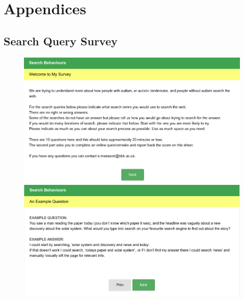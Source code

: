 \documentclass[a4paper, 11pt]{article}
\begin{document}
\newpage
\section {Appendices}

\newpage
\subsection{Search Query Survey} \label{AppendixA}

\begin{figure}[H]
\begin{center}
\includegraphics[scale=0.5]{survey1}\\
\includegraphics[scale=0.5]{survey2}\\
\end{center}
\end{figure}
\newpage
\end{document}
